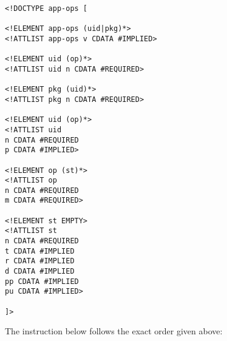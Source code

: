 \begin{Verbatim}
<!DOCTYPE app-ops [

<!ELEMENT app-ops (uid|pkg)*>
<!ATTLIST app-ops v CDATA #IMPLIED>

<!ELEMENT uid (op)*>
<!ATTLIST uid n CDATA #REQUIRED>

<!ELEMENT pkg (uid)*>
<!ATTLIST pkg n CDATA #REQUIRED>

<!ELEMENT uid (op)*>
<!ATTLIST uid
n CDATA #REQUIRED
p CDATA #IMPLIED>

<!ELEMENT op (st)*>
<!ATTLIST op
n CDATA #REQUIRED
m CDATA #REQUIRED>

<!ELEMENT st EMPTY>
<!ATTLIST st
n CDATA #REQUIRED
t CDATA #IMPLIED
r CDATA #IMPLIED
d CDATA #IMPLIED
pp CDATA #IMPLIED
pu CDATA #IMPLIED>

]>
\end{Verbatim}
The instruction below follows the exact order given above:
